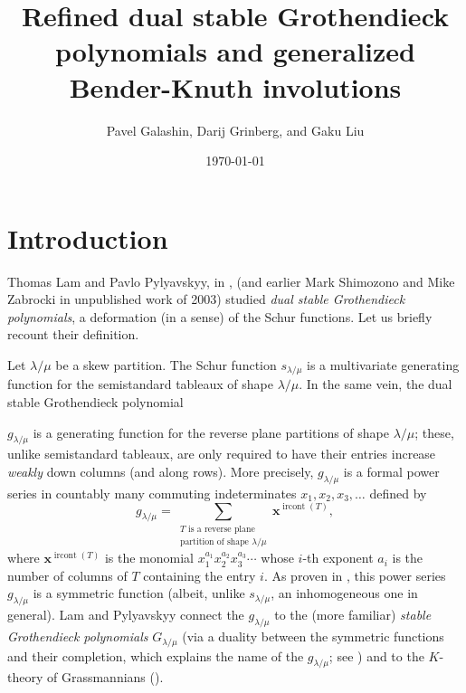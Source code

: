\documentclass[numbers=enddot,12pt,final,onecolumn,notitlepage]{scrartcl}%
\theoremstyle{definition}
\let\sumnonlimits\sum
\renewcommand{\sum}{\sumnonlimits\limits}
\begin{document}
\title{Refined dual stable Grothendieck polynomials and generalized Bender-Knuth involutions}
\author{Pavel Galashin, Darij Grinberg, and Gaku Liu}
\date{\today}
\maketitle

\section{Introduction}

Thomas Lam and Pavlo Pylyavskyy, in \cite[\S 9.1]{LamPyl}, (and earlier Mark
Shimozono and Mike Zabrocki in unpublished work of 2003) studied \textit{dual
stable Grothendieck polynomials}, a deformation (in a sense) of the Schur
functions. Let us briefly recount their definition.
\begin{comment}
 
\footnote{All definitions
that will be made in this introduction are provisional. Every notion that will
be used in the paper is going to be defined in more detail and precision in
one of the sections below; thus, a reader not already familiar with Schur
functions and partitions should start reading from Section
\ref{sect.notations} on.}

\end{comment}

Let $\lambda/\mu$ be a skew partition. The Schur function $s_{\lambda/\mu}$ is
a multivariate generating function for the semistandard tableaux of shape
$\lambda/\mu$. In the same vein, the dual stable Grothendieck
polynomial 
\begin{comment}
\footnote{The word \textquotedblleft polynomial\textquotedblright%
\ is a stretch: $g_{\lambda/\mu}$ is a bounded-degree power series in
infinitely many indeterminates (like $s_{\lambda/\mu}$).} 
\end{comment}
$g_{\lambda/\mu}$ is
a generating function for the reverse plane partitions of shape $\lambda/\mu$;
these, unlike semistandard tableaux, are only required to have their entries
increase \textit{weakly} down columns (and along rows). More precisely,
$g_{\lambda/\mu}$ is a formal power series in countably many commuting
indeterminates $x_{1},x_{2},x_{3},\ldots$ defined by
\[
g_{\lambda/\mu}=\sum_{\substack{T\text{ is a reverse plane}\\\text{partition
of shape }\lambda/\mu}}\mathbf{x}^{\operatorname*{ircont}\left(  T\right)  },
\]
where $\mathbf{x}^{\operatorname*{ircont}\left(  T\right)  }$ is the monomial
$x_{1}^{a_{1}}x_{2}^{a_{2}}x_{3}^{a_{3}}\cdots$ whose $i$-th exponent $a_{i}$
is the number of columns of $T$ containing the entry $i$. As proven in
\cite[\S 9.1]{LamPyl}, this power series $g_{\lambda/\mu}$ is a symmetric
function (albeit, unlike $s_{\lambda/\mu}$, an inhomogeneous one in general).
Lam and Pylyavskyy connect the $g_{\lambda/\mu}$ to the (more familiar)
\textit{stable Grothendieck polynomials} $G_{\lambda/\mu}$ (via a duality
between the symmetric functions and their completion, which explains the name
of the $g_{\lambda/\mu}$; see \cite[\S 9.4]{LamPyl}) and to the $K$-theory of
Grassmannians (\cite[\S 9.5]{LamPyl}).
\end{document}
